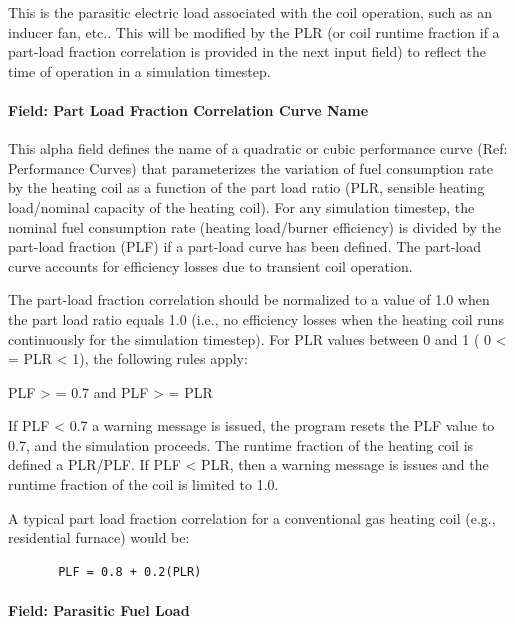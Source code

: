 This is the parasitic electric load associated with the coil operation, such as an inducer fan, etc.. This will be modified by the PLR (or coil runtime fraction if a part-load fraction correlation is provided in the next input field) to reflect the time of operation in a simulation timestep.

\paragraph{Field: Part Load Fraction Correlation Curve Name}\label{field-part-load-fraction-correlation-curve-name}

This alpha field defines the name of a quadratic or cubic performance curve (Ref: Performance Curves) that parameterizes the variation of fuel consumption rate by the heating coil as a function of the part load ratio (PLR, sensible heating load/nominal capacity of the heating coil). For any simulation timestep, the nominal fuel consumption rate (heating load/burner efficiency) is divided by the part-load fraction (PLF) if a part-load curve has been defined. The part-load curve accounts for efficiency losses due to transient coil operation.

The part-load fraction correlation should be normalized to a value of 1.0 when the part load ratio equals 1.0 (i.e., no efficiency losses when the heating coil runs continuously for the simulation timestep). For PLR values between 0 and 1 ( 0 \textless{} = PLR \textless{} 1), the following rules apply:

PLF \textgreater{} = 0.7 and PLF \textgreater{} = PLR

If PLF \textless{} 0.7 a warning message is issued, the program resets the PLF value to 0.7, and the simulation proceeds. The runtime fraction of the heating coil is defined a PLR/PLF. If PLF \textless{} PLR, then a warning message is issues and the runtime fraction of the coil is limited to 1.0.

A typical part load fraction correlation for a conventional gas heating coil (e.g., residential furnace) would be:

\begin{lstlisting}
       PLF = 0.8 + 0.2(PLR)
\end{lstlisting}

\paragraph{Field: Parasitic Fuel Load}\label{field-parasitic-gas-load}

